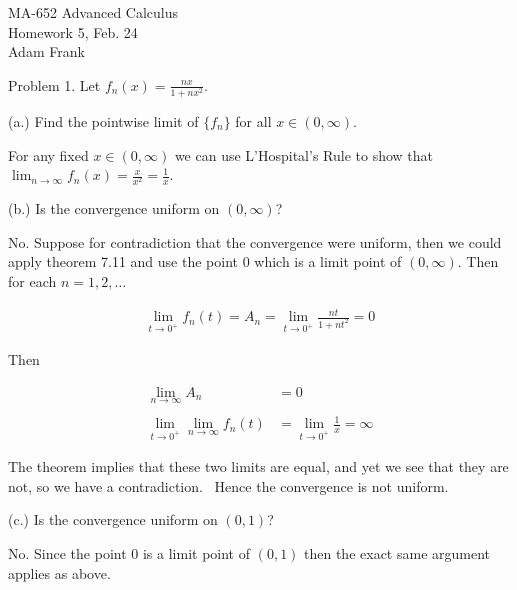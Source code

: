 \documentclass{article}
\begin{document}
  \begin{center} \Large
    MA-652 Advanced Calculus\\
    Homework 5, Feb. 24 \\
    Adam Frank
  \end{center}

  \vspace{1cm}

  {\Large \color{Sepia} Problem 1. Let $f_n(x)=\frac{nx}{1+nx^2}$.
  
  (a.) Find the pointwise limit of $\{f_n\}$ for all $x\in (0,\infty)$.}

  \vspace{1cm}

  For any fixed $x\in (0,\infty)$ we can use L'Hospital's Rule to show that $\displaystyle \lim_{n\to \infty} f_n(x) = \frac x {x^2} = \frac{1}{x}$.  

   \pagebreak

  {\Large \color{Sepia} (b.) Is the convergence uniform on $(0,\infty)$?}

  \vspace{1cm}

    No.  Suppose for contradiction that the convergence were uniform, then we could apply theorem 7.11 and use the point $0$ which is a limit point of $(0,\infty)$.  Then for each $n=1,2,\dots$ 

    \begin{align*}
        \lim_{t\to 0^+}f_n(t) = A_n = \lim_{t\to 0^+}\frac{nt}{1+nt^2} = 0
    \end{align*}

    Then 

    \begin{align*}
        \lim_{n\to \infty}A_n &= 0 \\\\
        \lim_{t\to 0^+}\lim_{n\to \infty} f_n(t) &= \lim_{t\to 0^+}\frac 1 x = \infty
    \end{align*}

    The theorem implies that these two limits are equal, and yet we see that they are not, so we have a contradiction.  \lightning \ Hence the convergence is not uniform.  


    \pagebreak

  {\Large \color{Sepia} (c.) Is the convergence uniform on $(0,1)$?}

  \vspace{1cm}

    No.  Since the point $0$ is a limit point of $(0,1)$ then the exact same argument applies as above.  
\end{document}
